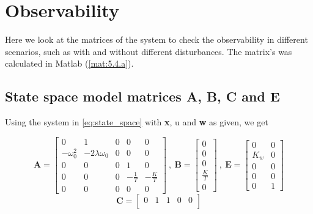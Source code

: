 
\section{Observability} \label{sec:part4}
Here we look at the matrices of the system to check the  observability in different scenarios, such as with and without different disturbances. The matrix's was calculated in Matlab (\ref{mat:5.4.a}). 


\subsection{State space model matrices A, B, C and E}\label{sec:part4-1}
Using the system in \cref{eq:state_space} with \textbf{x}, u and \textbf{w} as given, we get

\begin{equation}\label{eq:ss_with_dist1}
    \boldsymbol{A} = \begin{bmatrix}
        0 & 1 & 0 & 0 & 0 \\
        -\omega_0^2 & -2\lambda \omega_0 & 0 & 0 & 0 \\
        0 & 0 & 0 & 1 & 0 \\
        0 & 0 & 0 & -\frac{1}{T} & -\frac{K}{T} \\
        0 & 0 & 0 & 0 & 0 
    \end{bmatrix} \ , \ \boldsymbol{B} = \begin{bmatrix}
        0 \\ 0 \\ 0 \\ \frac{K}{T} \\ 0
    \end{bmatrix}\ , \ \boldsymbol{E} = \begin{bmatrix}
        0 & 0 \\
        K_w & 0 \\
        0 & 0 \\
        0 & 0 \\
        0 & 1 
    \end{bmatrix}
\end{equation}
\begin{equation}\label{eq:ss_with_dist2}
    \boldsymbol{C} = \begin{bmatrix} 
        0 & 1 & 1 & 0 & 0 \\
    \end{bmatrix}
\end{equation}

